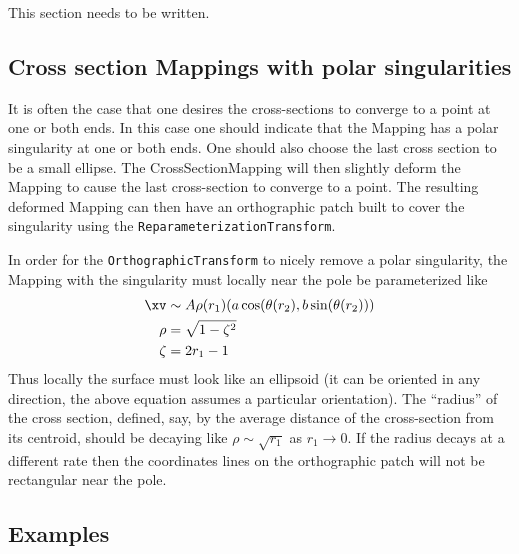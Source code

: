   This section needs to be written.

\subsection{Cross section Mappings with polar singularities}

   It is often the case that one desires the cross-sections to converge to a point at one or both ends.
In this case one should indicate that the Mapping has a polar singularity at one or both
ends. One should also choose the last cross section to be a small ellipse. The CrossSectionMapping
will then slightly deform the Mapping to cause the last cross-section to converge to a point. The
resulting deformed Mapping can then have an orthographic patch built to cover the singularity
using the {\tt ReparameterizationTransform}.

In order for the {\tt OrthographicTransform} to nicely remove a polar singularity, the Mapping with 
the singularity must locally near the pole be parameterized like
\begin{align*}
   \xv & \sim A \rho(r_1) (a \cos(\theta(r_2),b \sin(\theta(r_2))) \\
   \rho &= \sqrt{ 1 - \zeta^2 } \\
    \zeta &= 2 r_1 -1
\end{align*}
Thus locally the surface must look like an ellipsoid (it can be oriented in any direction, the above
equation assumes a particular orientation).
 The ``radius'' of the cross section, defined, say, by the average distance of the cross-section from its centroid,
should be decaying like $\rho\sim\sqrt{r_1}$ as $r_1\rightarrow 0$. If the radius decays at
a different rate then the coordinates lines on the orthographic patch will not be rectangular
near the pole.


\subsection{Examples}

